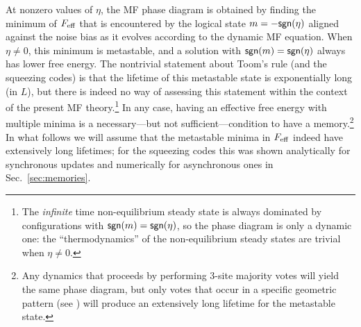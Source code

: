 \documentclass[pra,aps,twocolumn,groupedaddress,superscriptaddress,nofootinbib,preprintnumbers]{revtex4-2}
\begin{document}
	At nonzero values of $\eta$, the MF phase diagram is obtained by finding the minimum of $F_{\rm eff}$ that is encountered by the logical state $m=-{\sf sgn}(\eta)$ aligned against the noise bias as it evolves according to the dynamic MF equation. When $\eta \neq 0$, this minimum is metastable, and a solution with ${\sf sgn}(m) = {\sf sgn}(\eta)$ always has lower free energy. The nontrivial statement about Toom's rule (and the squeezing codes) is that the lifetime of this metastable state is exponentially long (in $L$), but there is indeed no way of assessing this statement within the context of the present MF theory.\footnote{The {\it infinite} time non-equilibrium steady state is always dominated by configurations with ${\sf sgn}(m) = {\sf sgn}(\eta)$, so the phase diagram is only a dynamic one: the ``thermodynamics'' of the non-equilibrium steady states are trivial when $\eta\neq0$.} In any case, having an effective free energy with multiple minima is a necessary---but not sufficient---condition to have a memory.\footnote{Any dynamics that proceeds by performing 3-site majority votes will yield the same phase diagram, but only votes that occur in a specific geometric pattern (see \cite{pajouheshgar2025exploring}) will produce an extensively long lifetime for the metastable state. } In what follows we will assume that the metastable minima in $F_{\rm eff}$ indeed have extensively long lifetimes; for the squeezing codes this was shown analytically for synchronous updates and numerically for asynchronous ones in Sec.~\ref{sec:memories}. 
	
\end{document}
